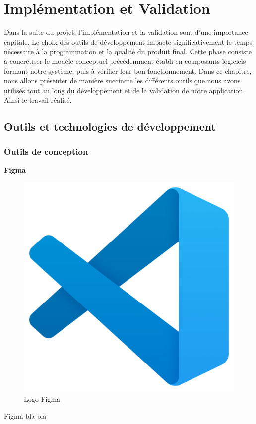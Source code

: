 

\chapter{Implémentation et Validation}
\pagestyle{chapterstyle}
Dans la suite du projet, l'implémentation et la validation 
sont d'une importance capitale. Le choix des outils de 
développement impacte significativement le temps nécessaire à 
la programmation et la qualité du produit final. Cette phase 
consiste à concrétiser le modèle conceptuel précédemment établi 
en composants logiciels formant notre système, puis à vérifier 
leur bon fonctionnement. Dans ce chapitre, nous allons présenter 
de manière succincte les différents outils que nous avons utilisés 
tout au long du développement et de la validation de notre 
application.
Ainsi le travail réalisé.

\newpage
\vspace{1cm}

\section{Outils et technologies de développement}
\subsection{Outils de conception}

\large 
\textbf{Figma}

\begin{figure}[htbp]
   \centering
   \includegraphics[scale=0.09]{Images/vs.png} 
   \caption{Logo Figma}
   \label{fig:vscode}
\end{figure}
Figma bla bla 

